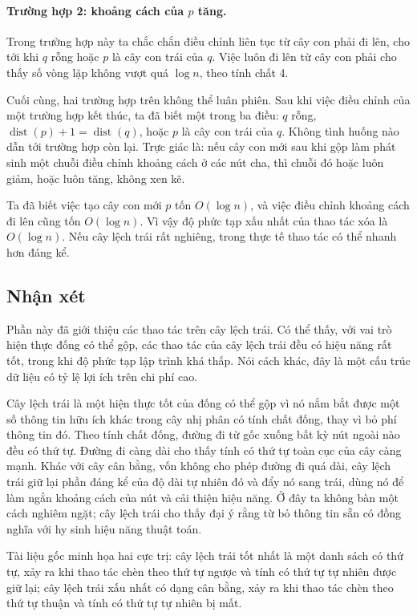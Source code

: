 \documentclass[11pt]{article}
\begin{document}
\paragraph{Trường hợp 2: khoảng cách của \(p\) tăng.}
Trong trường hợp này ta chắc chắn điều chỉnh liên tục từ cây con phải đi lên,
cho tới khi \(q\) rỗng hoặc \(p\) là cây con trái của \(q\). Việc luôn đi lên từ
cây con phải cho thấy số vòng lặp không vượt quá \(\log n\), theo tính chất 4.

Cuối cùng, hai trường hợp trên không thể luân phiên. Sau khi việc điều chỉnh
của một trường hợp kết thúc, ta đã biết một trong ba điều: \(q\) rỗng,
\(\operatorname{dist}(p)+1=\operatorname{dist}(q)\), hoặc \(p\) là cây con trái
của \(q\). Không tình huống nào dẫn tới trường hợp còn lại. Trực giác là: nếu
cây con mới sau khi gộp làm phát sinh một chuỗi điều chỉnh khoảng cách ở các
nút cha, thì chuỗi đó hoặc luôn giảm, hoặc luôn tăng, không xen kẽ.

Ta đã biết việc tạo cây con mới \(p\) tốn \(O(\log n)\), và việc điều chỉnh
khoảng cách đi lên cũng tốn \(O(\log n)\). Vì vậy độ phức tạp xấu nhất của thao
tác xóa là \(O(\log n)\). Nếu cây lệch trái rất nghiêng, trong thực tế thao tác
có thể nhanh hơn đáng kể.

\subsection{Nhận xét}

Phần này đã giới thiệu các thao tác trên cây lệch trái. Có thể thấy, với vai
trò hiện thực đống có thể gộp, các thao tác của cây lệch trái đều có hiệu năng
rất tốt, trong khi độ phức tạp lập trình khá thấp. Nói cách khác, đây là một
cấu trúc dữ liệu có tỷ lệ lợi ích trên chi phí cao.

Cây lệch trái là một hiện thực tốt của đống có thể gộp vì nó nắm bắt được một
số thông tin hữu ích khác trong cây nhị phân có tính chất đống, thay vì bỏ phí
thông tin đó. Theo tính chất đống, đường đi từ gốc xuống bất kỳ nút ngoài nào
đều có thứ tự. Đường đi càng dài cho thấy tính có thứ tự toàn cục của cây càng
mạnh. Khác với cây cân bằng, vốn không cho phép đường đi quá dài, cây lệch trái
giữ lại phần đáng kể của độ dài tự nhiên đó và đẩy nó sang trái, dùng nó để làm
ngắn khoảng cách của nút và cải thiện hiệu năng. Ở đây ta không bàn một cách
nghiêm ngặt; cây lệch trái cho thấy đại ý rằng từ bỏ thông tin sẵn có đồng nghĩa
với hy sinh hiệu năng thuật toán.

Tài liệu gốc minh họa hai cực trị: cây lệch trái tốt nhất là một danh sách có
thứ tự, xảy ra khi thao tác chèn theo thứ tự ngược và tính có thứ tự tự nhiên
được giữ lại; cây lệch trái xấu nhất có dạng cân bằng, xảy ra khi thao tác chèn
theo thứ tự thuận và tính có thứ tự tự nhiên bị mất.
\end{document}
